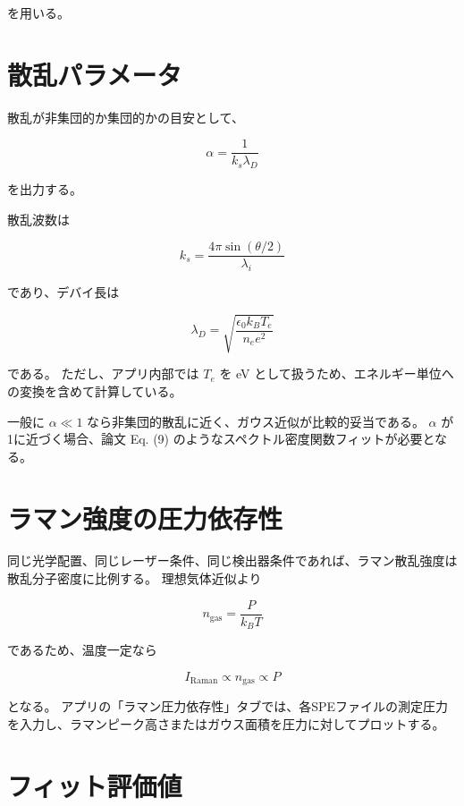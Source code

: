 \documentclass[11pt]{ltjsarticle}
\begin{document}
を用いる。

\section{散乱パラメータ}

散乱が非集団的か集団的かの目安として、

\begin{equation}
\alpha =
\frac{1}{k_s\lambda_D}
\end{equation}

を出力する。

散乱波数は

\begin{equation}
k_s =
\frac{4\pi\sin(\theta/2)}
{\lambda_i}
\end{equation}

であり、デバイ長は

\begin{equation}
\lambda_D =
\sqrt{
\frac{\epsilon_0 k_B T_e}
{n_e e^2}
}
\end{equation}

である。
ただし、アプリ内部では $T_e$ を \si{eV} として扱うため、エネルギー単位への変換を含めて計算している。

一般に $\alpha\ll1$ なら非集団的散乱に近く、ガウス近似が比較的妥当である。
$\alpha$ が1に近づく場合、論文 Eq. (9) のようなスペクトル密度関数フィットが必要となる。

\section{ラマン強度の圧力依存性}

同じ光学配置、同じレーザー条件、同じ検出器条件であれば、ラマン散乱強度は散乱分子密度に比例する。
理想気体近似より

\begin{equation}
n_{\mathrm{gas}} =
\frac{P}{k_B T}
\end{equation}

であるため、温度一定なら

\begin{equation}
I_{\mathrm{Raman}}
\propto n_{\mathrm{gas}}
\propto P
\end{equation}

となる。
アプリの「ラマン圧力依存性」タブでは、各SPEファイルの測定圧力を入力し、ラマンピーク高さまたはガウス面積を圧力に対してプロットする。

\section{フィット評価値}
\end{document}
